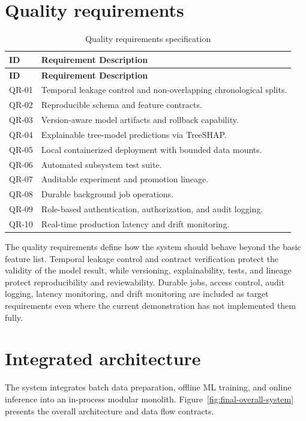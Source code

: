 \section{Quality requirements}

\begin{longtable}{p{}p{}}
\caption{Quality requirements specification}
\label{tab:quality-requirements}\\
\toprule
\textbf{ID} & \textbf{Requirement Description}\\
\midrule
\endfirsthead
\toprule
\textbf{ID} & \textbf{Requirement Description}\\
\midrule
\endhead
QR-01 & Temporal leakage control and non-overlapping chronological splits.\\
QR-02 & Reproducible schema and feature contracts.\\
QR-03 & Version-aware model artifacts and rollback capability.\\
QR-04 & Explainable tree-model predictions via TreeSHAP.\\
QR-05 & Local containerized deployment with bounded data mounts.\\
QR-06 & Automated subsystem test suite.\\
QR-07 & Auditable experiment and promotion lineage.\\
QR-08 & Durable background job operations.\\
QR-09 & Role-based authentication, authorization, and audit logging.\\
QR-10 & Real-time production latency and drift monitoring.\\
\bottomrule
\end{longtable}

The quality requirements define how the system should behave beyond the basic
feature list. Temporal leakage control and contract verification protect the
validity of the model result, while versioning, explainability, tests, and
lineage protect reproducibility and reviewability. Durable jobs, access control,
audit logging, latency monitoring, and drift monitoring are included as target
requirements even where the current demonstration has not implemented them
fully.

\section{Integrated architecture}

The system integrates batch data preparation, offline ML training, and online inference into an in-process modular monolith. Figure~\ref{fig:final-overall-system} presents the overall architecture and data flow contracts.

